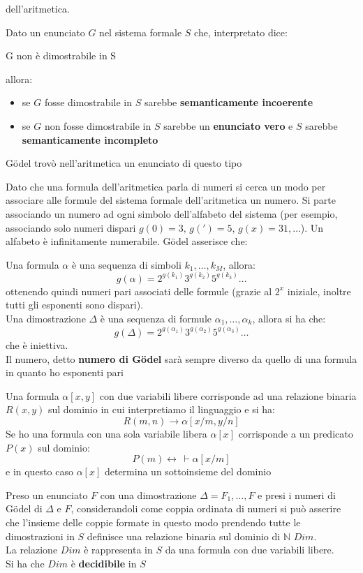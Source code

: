 \documentclass[a4paper,12pt, oneside]{book}
\begin{document}
dell'aritmetica.
\begin{teorema}
  Dato un enunciato $G$ nel sistema formale $S$ che, interpretato dice:
  \begin{center}
    G non è dimostrabile in S
  \end{center}
  allora:
  \begin{itemize}
    \item se $G$ fosse dimostrabile in $S$ sarebbe \textbf{semanticamente
      incoerente} 
    \item se $G$ non fosse dimostrabile in $S$ sarebbe un \textbf{enunciato
      vero} e $S$ sarebbe \textbf{semanticamente incompleto}
  \end{itemize}
  G\"{o}del trovò nell'aritmetica un enunciato di questo tipo
\end{teorema}
Dato che una formula dell'aritmetica parla di numeri si cerca un modo per
associare alle formule del sistema formale dell'aritmetica un numero. Si parte
associando un numero ad ogni simbolo dell'alfabeto del sistema (per esempio,
associando solo numeri dispari $g(0)=3,\,g(')=5,\,g(x)=31,\ldots$). Un alfabeto
è infinitamente numerabile. G\"{o}del asserisce che:
\begin{definizione}
  Una formula $\alpha$ è una sequenza di simboli $k_1,\ldots,k_M$, allora:
  \[g(\alpha)=2^{g(k_1)}3^{g(k_2)}5^{g(k_3)}\ldots\]
  ottenendo quindi numeri pari associati delle formule (grazie al
  $2^x$ iniziale, inoltre tutti gli esponenti sono dispari).\\
  Una dimostrazione $\Delta$ è una sequenza di formule
  $\alpha_1,\ldots,\alpha_k$, allora si ha che:
  \[g(\Delta)=2^{g(\alpha_1)}3^{g(\alpha_2)}5^{g(\alpha_3)}\ldots\]
  che è iniettiva.\\
  Il numero, detto \textbf{numero di G\"{o}del} sarà sempre diverso da quello di
  una formula in quanto ho esponenti pari
\end{definizione}
Una formula $\alpha[x,y]$ con due variabili libere corrisponde ad una relazione
binaria $R(x,y)$ sul dominio in cui interpretiamo il linguaggio e si ha:
\[R(m,n)\to\alpha[x/m,y/n]\]
Se ho una formula con una sola variabile libera $\alpha[x]$ corrisponde a un
predicato $P(x)$ sul dominio:
\[P(m)\leftrightarrow \,\vdash\alpha[x/m]\]
e in questo caso $\alpha[x]$ determina un sottoinsieme del dominio
\begin{definizione}
  Preso un enunciato $F$ con una dimostrazione $\Delta=F_1,\ldots,F$ e presi i
  numeri di G\"{o}del di $\Delta$ e $F$, considerandoli come coppia ordinata di
  numeri si può asserire che l'insieme delle coppie formate in questo modo
  prendendo tutte le dimostrazioni in $S$ definisce una relazione binaria sul
  dominio di $\mathbb{N}$ $Dim$.\\
  La relazione $Dim$ è rappresenta in $S$ da una formula con due variabili
  libere.\\
  Si ha che $Dim$ è \textbf{decidibile} in $S$
\end{definizione}
\end{document}
